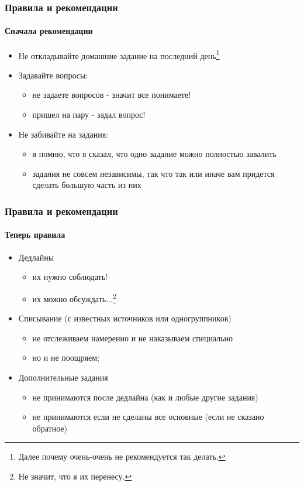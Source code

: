 \begin{frame}
\frametitle{Правила и рекомендации}
\framesubtitle{Сначала рекомендации}

\begin{itemize}
  \item<1-> Не откладывайте домашние задание на последний день\footnote{Далее
            почему очень-очень не рекомендуется так делать.}
  \item<2-> Задавайте вопросы:
    \begin{itemize}
      \item<3-> не задаете вопросов - значит все понимаете!
      \item<4-> пришел на пару - задал вопрос! 
    \end{itemize}
  \item<6-> Не забивайте на задания:
    \begin{itemize}
      \item<7-> я помню, что я сказал, что одно задание можно полностью завалить
      \item<8-> задания не совсем независимы, так что так или иначе вам придется
                сделать большую часть из них
    \end{itemize}
\end{itemize}
\end{frame}


\begin{frame}
\frametitle{Правила и рекомендации}
\framesubtitle{Теперь правила}

\begin{itemize}
  \item<1-> Дедлайны
    \begin{itemize}
      \item<2-> их нужно соблюдать!
      \item<3-> их можно обсуждать...\footnote{Не значит, что я их перенесу.}
    \end{itemize}
  \item<4-> Списывание (с известных источников или одногруппников)
    \begin{itemize}
      \item<5-> не отслеживаем намеренно и не наказываем специально
      \item<6-> но и не поощряем; 
    \end{itemize}
  \item<8-> Дополнительные задания
    \begin{itemize}
      \item<9-> не принимаются после дедлайна (как и любые другие задания)
      \item<10-> не принимаются если не сделаны все основные (если не сказано
                 обратное)
    \end{itemize}
\end{itemize}
\end{frame}
